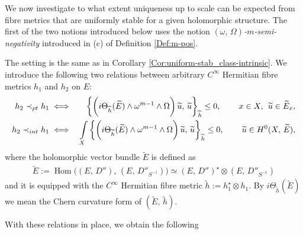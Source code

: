 \documentclass[12pt]{article}
\begin{document}
\vspace{2ex}

We now investigate to what extent uniqueness up to scale can be expected from fibre metrics that are uniformly stable for a given holomorphic structure. The first of the two notions introduced below uses the notion {\it $(\omega,\,\Omega)$-$m$-semi-negativity} introduced in (c) of Definition \ref{Def:m-pos}. 

\begin{Def}\label{Def:relations_metrics} The setting is the same as in Corollary \ref{Cor:uniform-stab_class-intrinsic}. We introduce the following two relations between arbitrary $C^\infty$ Hermitian fibre metrics $h_1$ and $h_2$ on $E$: \begin{eqnarray*}h_2\prec_{pt} h_1 & \iff & \bigg\{\bigg(i\Theta_{\widetilde{h}}(\widetilde{E})\wedge\omega^{m-1}\wedge\Omega\bigg)\,\widetilde{u},\,\widetilde{u}\bigg\}_{\widetilde{h}}\leq 0, \hspace{5ex} x\in X, \hspace{1ex} \widetilde{u}\in\widetilde{E}_x, \\
 h_2\prec_{int} h_1 & \iff & \int\limits_X\bigg\{\bigg(i\Theta_{\widetilde{h}}(\widetilde{E})\wedge\omega^{m-1}\wedge\Omega\bigg)\,\widetilde{u},\,\widetilde{u}\bigg\}_{\widetilde{h}}\leq 0, \hspace{5ex}  \widetilde{u}\in H^0(X,\,\widetilde{E}),\end{eqnarray*} where the holomorphic vector bundle $\widetilde{E}$ is defined as \begin{eqnarray*}\widetilde{E}:=\operatorname{Hom}\bigg((E,\,D''),\,(E,\,D''_{S^{-1}})\bigg)\simeq (E,\,D'')^\star\otimes(E,\,D''_{S^{-1}})\end{eqnarray*} and it is equipped with the $C^\infty$ Hermitian fibre metric $\widetilde{h}:=h_1^\star\otimes h_1$. By $i\Theta_{\widetilde{h}}(\widetilde{E})$ we mean the Chern curvature form of $(\widetilde{E},\,\widetilde{h})$.

\end{Def}  

With these relations in place, we obtain the following
\end{document}

